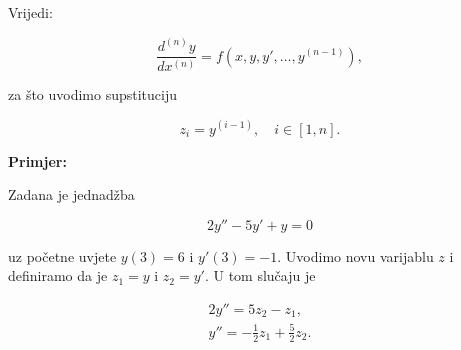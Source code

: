 Vrijedi:

$$
\dfrac{d^{(n)}y}{dx^{(n)}} = f(x, y, y', \dots, y^{(n-1)}),
$$

za što uvodimo supstituciju

$$
    z_i = y^{(i-1)},\quad i \in [1, n].
$$

\textbf{Primjer:}

Zadana je jednadžba

$$
2y''-5y'+y=0
$$

uz početne uvjete $y(3)=6$ i $y'(3)=-1$. Uvodimo novu varijablu $z$ i definiramo
da je $z_1=y$ i $z_2=y'$. U tom slučaju je

\begin{gather*}
    2y''=5z_2 - z_1,\\
    y''=-\frac{1}{2}z_1+\frac{5}{2}z_2.
\end{gather*}
